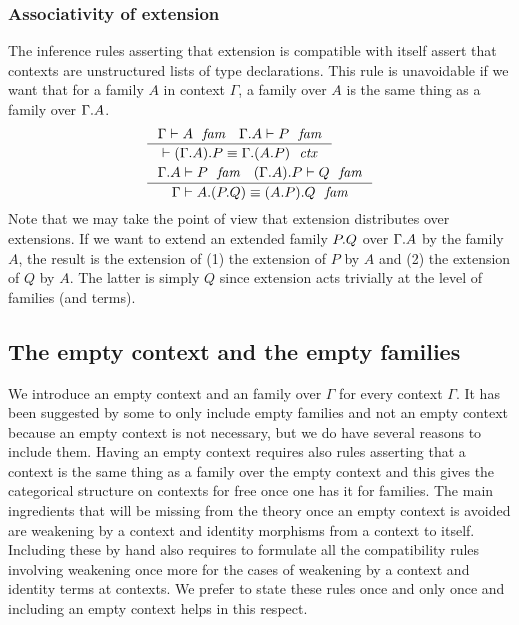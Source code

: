\subsubsection{Associativity of extension}
\label{comp-ee}
The inference rules asserting that extension is compatible with itself assert
that contexts are unstructured lists of type declarations. This rule is
unavoidable if we want that for a family $A$ in context $\Gamma$, a family over
$A$ is the same thing as a family over $\ctxext{\Gamma}{A}$. 
\begin{align}
& \inference
  { \jfam{\Gamma}{A}
    \jfam{{\Gamma}{A}}{P}
    }
  { \jctxeq{\ctxext{{\Gamma}{A}}{P}}{\ctxext{\Gamma}{{A}{P}}}
    }
  \\
& \inference
  { \jfam{{\Gamma}{A}}{P}
    \jfam{{{\Gamma}{A}}{P}}{Q}
    }
  { \jfameq{\Gamma}{\ctxext{A}{{P}{Q}}}{\ctxext{{A}{P}}{Q}}
    }
  \label{comp-ee-c}
\end{align}
Note that we may take the point of view that extension distributes over
extensions. If we want to extend an extended family $\ctxext{P}{Q}$ over
$\ctxext{\Gamma}{A}$ by the family $A$, the result is the extension of (1)
the extension of $P$ by $A$ and (2) the extension of $Q$ by $A$. The latter is
simply $Q$ since extension acts trivially at the level of families (and terms).

\subsection{The empty context and the empty families}
\label{empty}
We introduce an empty context and an family over $\Gamma$ for every context $\Gamma$. 
It has been suggested by some to only include empty families and not an
empty context because an empty context is not necessary, but we do have several
reasons to include them. Having an empty context requires also rules asserting 
that a context is the same thing as a family over the empty context and this
gives the categorical structure on contexts for free once one has it for 
families. The main ingredients that will be missing from the theory once an
empty context is avoided are weakening by a context and identity morphisms from
a context to itself. Including these by hand also requires to formulate all the
compatibility rules involving weakening once more for the cases of weakening by
a context and identity terms at contexts. We prefer to state these rules once
and only once and including an empty context helps in this respect.

